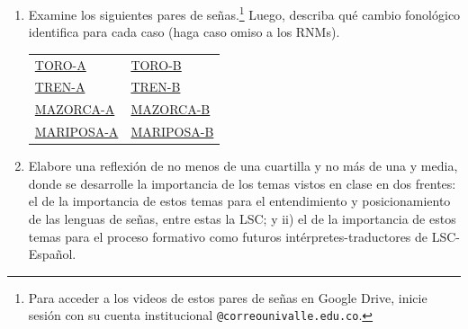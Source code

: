\begin{enumerate}[leftmargin=*, itemsep=12pt]
\item Examine los siguientes pares de señas.\footnote{Para acceder a los videos de estos pares de señas en Google Drive, inicie sesión con su cuenta institucional \texttt{@correounivalle.edu.co}.} Luego, describa qué cambio fonológico identifica para cada caso (haga caso omiso a los RNMs).

\begin{center}\begin{tabular}{ll}

\href{https://drive.google.com/file/d/1AVrkiZDxv0dDYBSvmPsWHvxJtMWPr0lO/view?usp=sharing}{TORO-A} & \href{https://drive.google.com/file/d/1AVsL2i6q\_lynJ7EGMli4vbLgcGlXLsBk/view?usp=sharing}{TORO-B} \\[5pt]

\href{https://drive.google.com/file/d/1At4c1E5j9YGr468nGAW5eG5hCORmcsYD/view?usp=sharing}{TREN-A} & \href{https://drive.google.com/file/d/1AkfI6k6QHorgac2BuR\_znuCb5VfMtP77/view?usp=sharing}{TREN-B} \\[5pt]

\href{https://drive.google.com/file/d/1AXutZpCEkWHc62\_JArNaTR32TfsoUw5c/view?usp=sharing}{MAZORCA-A} & \href{https://drive.google.com/file/d/1A\_Ct3E7so1UZRenrKTgDvzpTRbm88kJG/view?usp=sharing}{MAZORCA-B} \\[5pt]

\href{https://drive.google.com/file/d/1ATcgn3aEv0bko\_VM-DGry2yRKLve4ygj/view?usp=sharing}{MARIPOSA-A} & \href{https://drive.google.com/file/d/1AMlQWaGYu3kwJStCfA91HZHNdrxzcZyw/view?usp=sharing}{MARIPOSA-B} \\[5pt]

\end{tabular}\end{center}

\item Elabore una reflexión de no menos de una cuartilla y no más de una y media, donde se desarrolle la importancia de los temas vistos en clase en dos frentes: el de la importancia de estos temas para el entendimiento y posicionamiento de las lenguas de señas, entre estas la LSC; y ii) el de la importancia de estos temas para el proceso formativo como futuros intérpretes-traductores de LSC-Español.

\end{enumerate}
